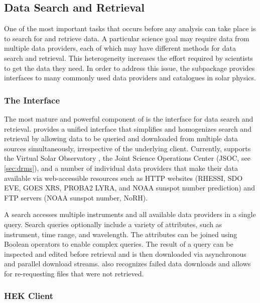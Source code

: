 
\subsection{Data Search and Retrieval}
\label{sec:fido}

One of the most important tasks that occurs before any analysis can take place is to search for and retrieve data.
A particular science goal may require data from multiple data providers, each of which may have different methods for data search and retrieval.
This heterogeneity increases the effort required by scientists to get the data they need.
In order to address this issue, the  subpackage provides interfaces to many commonly used data providers and catalogues in solar physics.

\subsubsection{The \Fido Interface}
\label{sec:fido}

The most mature and powerful component of  is the \Fido interface for data search and retrieval.
\Fido provides a unified interface that simplifies and homogenizes search and retrieval by allowing data to be queried and downloaded from multiple data sources simultaneously, irrespective of the underlying client.
Currently, \Fido supports the Virtual Solar Observatory \citep[VSO,][]{2009EM&P..104..315H}, the Joint Science Operations Center (JSOC, see \autoref{sec:drms}), and a number of individual data providers that make their data available via web-accessible resources such as HTTP websites (RHESSI, SDO EVE, GOES XRS, PROBA2 LYRA, and NOAA sunspot number prediction) and FTP servers (NOAA sunspot number, NoRH).

A \Fido search accesses multiple instruments and all available data providers in a single query.
Search queries optionally include a variety of attributes, such as instrument, time range, and wavelength.
The attributes can be joined using Boolean operators to enable complex queries.
The result of a \Fido query can be inspected and edited before retrieval and is then downloaded via asynchronous and parallel download streams.
\Fido also recognizes failed data downloads and allows for re-requesting files that were not retrieved.

\subsubsection{HEK Client}
\label{sec:hek}

